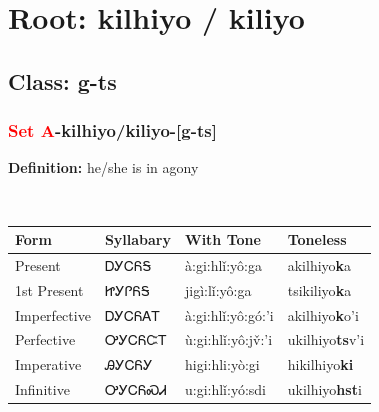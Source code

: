 \needspace{4in}
\section*{Root: kilhiyo / kiliyo}
\nopagebreak
{}
\needspace{3in}
\subsection*{Class: g-ts}
\nopagebreak
\needspace{2in}
\subsubsection*{\textcolor{Red}{Set A}{-}\textbf{kilhiyo/kiliyo}{-}[g-ts]}
\nopagebreak
\textbf{Definition: } he/she is in agony
\\[0.5em]
\begin{tabularx}{\textwidth}{l X X X}%
\toprule%
\textbf{Form}&\textbf{Syllabary}&\textbf{With Tone}&\textbf{Toneless}\\%
\midrule%
Present&ᎠᎩᏟᏲᎦ&à:gi:hlǐ:yô:ga&akilhiyo\textbf{k}a\\%
1st Present&ᏥᎩᎵᏲᎦ&jigì:lǐ:yô:ga&tsikiliyo\textbf{k}a\\%
Imperfective&ᎠᎩᏟᏲᎪᎢ&à:gi:hlǐ:yô:gó:’i&akilhiyo\textbf{k}o'i\\%
Perfective&ᎤᎩᏟᏲᏨᎢ&ù:gi:hlǐ:yô:jv̌:’i&ukilhiyo\textbf{ts}v'i\\%
Imperative&ᎯᎩᏟᏲᎩ&higi:hli:yò:gi&hikilhiyo\textbf{ki}\\%
Infinitive&ᎤᎩᏟᏲᏍᏗ&u:gi:hlǐ:yó:sdi&ukilhiyo\textbf{hst}i\\%
\bottomrule%
\end{tabularx}
\\[1em]